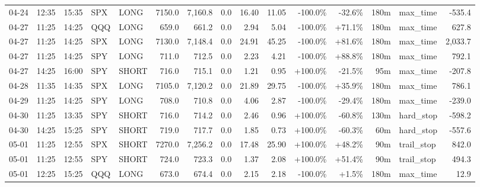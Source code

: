 \documentclass[11pt,a4paper,twoside]{article}
\begin{document}
\begin{landscape}
\begin{center}
\begin{longtable}{>{\color{txtmain}}l l l l l r r r r r r r r >{\color{txtmain}}l r}
04-24 & 12:35 & 15:35 & SPX & LONG & 7150.0 & 7,160.8 & 0.0 & 16.40 & 11.05 & \textcolor{lossred}{-100.0\%} & \textcolor{lossred}{-32.6\%} & 180m & max\_time & \textcolor{lossred}{-535.4} \\
04-27 & 11:25 & 14:25 & QQQ & LONG & 659.0 & 661.2 & 0.0 & 2.94 & 5.04 & \textcolor{lossred}{-100.0\%} & \textcolor{wingreen}{+71.1\%} & 180m & max\_time & \textcolor{wingreen}{627.8} \\
04-27 & 11:25 & 14:25 & SPX & LONG & 7130.0 & 7,148.4 & 0.0 & 24.91 & 45.25 & \textcolor{lossred}{-100.0\%} & \textcolor{wingreen}{+81.6\%} & 180m & max\_time & \textcolor{wingreen}{2,033.7} \\
04-27 & 11:25 & 14:25 & SPY & LONG & 711.0 & 712.5 & 0.0 & 2.23 & 4.21 & \textcolor{lossred}{-100.0\%} & \textcolor{wingreen}{+88.8\%} & 180m & max\_time & \textcolor{wingreen}{792.1} \\
04-27 & 14:25 & 16:00 & SPY & SHORT & 716.0 & 715.1 & 0.0 & 1.21 & 0.95 & \textcolor{wingreen}{+100.0\%} & \textcolor{lossred}{-21.5\%} & 95m & max\_time & \textcolor{lossred}{-207.8} \\
04-28 & 11:35 & 14:35 & SPX & LONG & 7105.0 & 7,120.2 & 0.0 & 21.89 & 29.75 & \textcolor{lossred}{-100.0\%} & \textcolor{wingreen}{+35.9\%} & 180m & max\_time & \textcolor{wingreen}{786.1} \\
04-29 & 11:25 & 14:25 & SPY & LONG & 708.0 & 710.8 & 0.0 & 4.06 & 2.87 & \textcolor{lossred}{-100.0\%} & \textcolor{lossred}{-29.4\%} & 180m & max\_time & \textcolor{lossred}{-239.0} \\
04-30 & 11:25 & 13:35 & SPY & SHORT & 716.0 & 714.2 & 0.0 & 2.46 & 0.96 & \textcolor{wingreen}{+100.0\%} & \textcolor{lossred}{-60.8\%} & 130m & hard\_stop & \textcolor{lossred}{-598.2} \\
04-30 & 14:25 & 15:25 & SPY & SHORT & 719.0 & 717.7 & 0.0 & 1.85 & 0.73 & \textcolor{wingreen}{+100.0\%} & \textcolor{lossred}{-60.3\%} & 60m & hard\_stop & \textcolor{lossred}{-557.6} \\
05-01 & 11:25 & 12:55 & SPX & SHORT & 7270.0 & 7,256.2 & 0.0 & 17.48 & 25.90 & \textcolor{wingreen}{+100.0\%} & \textcolor{wingreen}{+48.2\%} & 90m & trail\_stop & \textcolor{wingreen}{842.0} \\
05-01 & 11:25 & 12:55 & SPY & SHORT & 724.0 & 723.3 & 0.0 & 1.37 & 2.08 & \textcolor{wingreen}{+100.0\%} & \textcolor{wingreen}{+51.4\%} & 90m & trail\_stop & \textcolor{wingreen}{494.3} \\
05-01 & 12:25 & 15:25 & QQQ & LONG & 673.0 & 674.4 & 0.0 & 2.15 & 2.18 & \textcolor{lossred}{-100.0\%} & \textcolor{wingreen}{+1.5\%} & 180m & max\_time & \textcolor{wingreen}{12.9} \\

\end{longtable}
\end{center}
\end{landscape}
\end{document}

